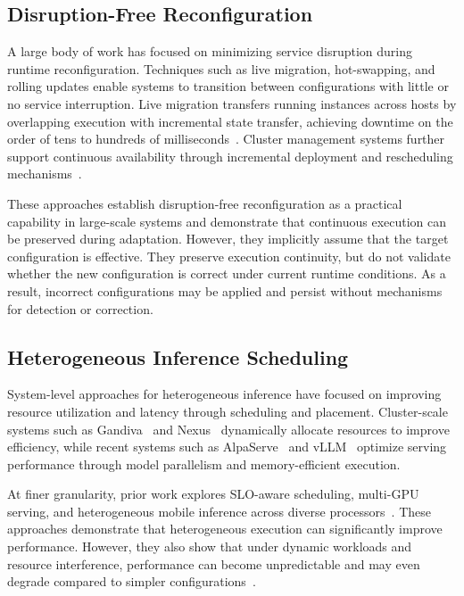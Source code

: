 \documentclass[conference]{IEEEtran}
\begin{document}
{\subsection{Disruption-Free Reconfiguration}

A large body of work has focused on minimizing service disruption during runtime reconfiguration.
Techniques such as live migration, hot-swapping, and rolling updates enable systems to transition between configurations with little or no service interruption.
Live migration transfers running instances across hosts by overlapping execution with incremental state transfer, achieving downtime on the order of tens to hundreds of milliseconds~\cite{clark2005live}.
Cluster management systems further support continuous availability through incremental deployment and rescheduling mechanisms~\cite{burns2016borg, verma2015large, gandiva2018osdi, nexus2019sosp}.

These approaches establish disruption-free reconfiguration as a practical capability in large-scale systems and demonstrate that continuous execution can be preserved during adaptation.
However, they implicitly assume that the target configuration is effective.
They preserve execution continuity, but do not validate whether the new configuration is correct under current runtime conditions.
As a result, incorrect configurations may be applied and persist without mechanisms for detection or correction.


\subsection{Heterogeneous Inference Scheduling}

System-level approaches for heterogeneous inference have focused on improving resource utilization and latency through scheduling and placement.
Cluster-scale systems such as Gandiva~\cite{gandiva2018osdi} and Nexus~\cite{nexus2019sosp} dynamically allocate resources to improve efficiency, while recent systems such as AlpaServe~\cite{alpaserve2023osdi} and vLLM~\cite{vllm2023sosp} optimize serving performance through model parallelism and memory-efficient execution.

At finer granularity, prior work explores SLO-aware scheduling, multi-GPU serving, and heterogeneous mobile inference across diverse processors~\cite{park_taco2021_slo, choi_atc2022_spatiotemporal, liu2024heterogeneous_mobile}.
These approaches demonstrate that heterogeneous execution can significantly improve performance.
However, they also show that under dynamic workloads and resource interference, performance can become unpredictable and may even degrade compared to simpler configurations~\cite{liu2024heterogeneous_mobile}.

}
\end{document}
